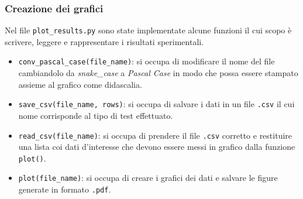 \subsubsection*{Creazione dei grafici}
Nel file \texttt{plot\_results.py} sono state implementate alcune funzioni il cui scopo è scrivere, leggere e rappresentare i risultati sperimentali. 
\begin{itemize}
	\item \texttt{conv\_pascal\_case(file\_name)}: si occupa di modificare il nome del file cambiandolo da \textit{snake\_case} a \textit{Pascal Case} in modo che possa essere stampato assieme al grafico come didascalia.
	\item \texttt{save\_csv(file\_name, rows)}: si occupa di salvare i dati in un file \texttt{.csv} il cui nome corrisponde al tipo di test effettuato.
	\item \texttt{read\_csv(file\_name)}: si occupa di prendere il file \texttt{.csv} corretto e restituire una lista coi dati d'interesse che devono essere messi in grafico dalla funzione \texttt{plot()}.
	\item \texttt{plot(file\_name)}: si occupa di creare i grafici dei dati e salvare le figure generate in formato \texttt{.pdf}.
\end{itemize}

\newpage